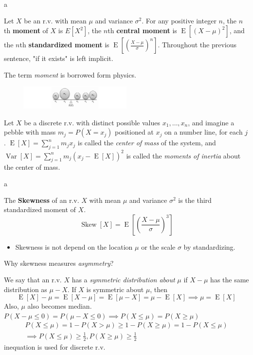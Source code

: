 \documentclass[8pt]{beamer}
\newcommand{\tb}[1]{\textbf{#1}}
\newcommand{\ti}[1]{\textit{#1}}
\newcommand{\expec}[1]{\operatorname{E}\left[ #1 \right]}
\newcommand{\myvar}[1]{\operatorname{Var}\left[#1\right]}
\newcommand{\myskew}[1]{\operatorname{Skew}\!\left[#1\right]}
\begin{document}
\begin{frame}{a}
    \begin{definition}
        Let $X$ be an r.v. with mean $\mu$ and variance $\sigma^2$. For any positive integer $n$, the $n$th \tb{moment} of $X$ is $E[X^2]$, the $n$th \tb{central moment} is $\expec{(X-\mu)^2}$, and the $n$th \tb{standardized moment} is $\expec{\left(\frac{X-\mu}{\sigma}\right)^n}$. Throughout the previous sentence, "if it exists" is left implicit.
    \end{definition}

    \bigskip
    The term \ti{moment} is borrowed form physics.
    \begin{figure}
        \centering
        \includegraphics[width=0.5\textwidth]{fig2.png}
    \end{figure}
    Let $X$ be a discrete r.v. with distinct possible values $x_1, \dots, x_n$, and imagine a pebble with mass $m_j = P(X=x_j)$ positioned at $x_j$ on a number line, for each $j$.
    $\expec{X} = \sum_{j=1}^n m_j x_j$ is called the \ti{center of mass} of the system, and $\myvar{X} = \sum_{j=1}^n m_j (x_j - \expec{X})^2$ is called the \ti{moments of inertia} about the center of mass.

\end{frame}

\begin{frame}{a}
    \begin{definition}[Skewness]
        The \tb{Skewness} of an r.v. $X$ with mean $\mu$ and variance $\sigma^2$ is the third standardized moment of $X$.
        \[
            \myskew{X} = \expec{\left(\frac{X-\mu}{\sigma} \right)^3}
        \]
    \end{definition}
    \begin{itemize}
        \item Skewness is not depend on the location $\mu$ or the scale $\sigma$ by standardizing.
    \end{itemize}
    Why skewness measures \ti{asymmetry}?

    \begin{definition}[Symmetry of an r.v.]
        We say that an r.v. $X$ has a \ti{symmetric distribution about} $\mu$ if $X - \mu$ has the same distribution as $\mu - X$. If $X$ is symmetric about $\mu$, then
        \[
            \expec{X} - \mu = \expec{X - \mu} = \expec{\mu - X} = \mu - \expec{X} \implies \mu = \expec{X}
        \]
        Also, $\mu$ also becomes median. $P(X-\mu \leq 0) = P(\mu - X \leq 0) \implies P(X \leq \mu) = P(X \geq \mu)$
        \[
        \begin{gathered}
            P(X \leq \mu) = 1 - P(X > \mu) \geq 1 - P(X \geq \mu) = 1- P(X \leq \mu) \\
            \implies P(X \leq \mu) \geq \frac{1}{2}, P(X \geq \mu) \geq \frac{1}{2}
        \end{gathered}
        \]
        inequation is used for discrete r.v.
    \end{definition}
\end{frame}
\end{document}
